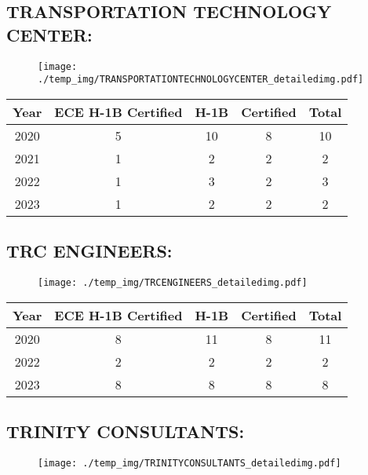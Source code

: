 \documentclass{article}%
\begin{document}
%
\newpage%
\subsection{TRANSPORTATION TECHNOLOGY CENTER:}%
\label{subsec:TRANSPORTATIONTECHNOLOGYCENTER}%
\label{TRANSPORTATIONTECHNOLOGYCENTERdetailed}%


\begin{figure}[htbp]%
\centering%
\texttt{[image: ./temp\_img/TRANSPORTATIONTECHNOLOGYCENTER\_detailedimg.pdf]}%
\end{figure}

%
\begin{longtable}{c|c|c|c|c}%
\hline%
Year&ECE H{-}1B Certified&H{-}1B&Certified&Total\\%
\hline%
2020&5&10&8&10\\%
\hline%
2021&1&2&2&2\\%
\hline%
2022&1&3&2&3\\%
\hline%
2023&1&2&2&2\\%
\hline%
\end{longtable}

%
\newpage%
\subsection{TRC ENGINEERS:}%
\label{subsec:TRCENGINEERS}%
\label{TRCENGINEERSdetailed}%


\begin{figure}[htbp]%
\centering%
\texttt{[image: ./temp\_img/TRCENGINEERS\_detailedimg.pdf]}%
\end{figure}

%
\begin{longtable}{c|c|c|c|c}%
\hline%
Year&ECE H{-}1B Certified&H{-}1B&Certified&Total\\%
\hline%
2020&8&11&8&11\\%
\hline%
2022&2&2&2&2\\%
\hline%
2023&8&8&8&8\\%
\hline%
\end{longtable}

%
\newpage%
\subsection{TRINITY CONSULTANTS:}%
\label{subsec:TRINITYCONSULTANTS}%
\label{TRINITYCONSULTANTSdetailed}%


\begin{figure}[htbp]%
\centering%
\texttt{[image: ./temp\_img/TRINITYCONSULTANTS\_detailedimg.pdf]}%
\end{figure}
\end{document}
